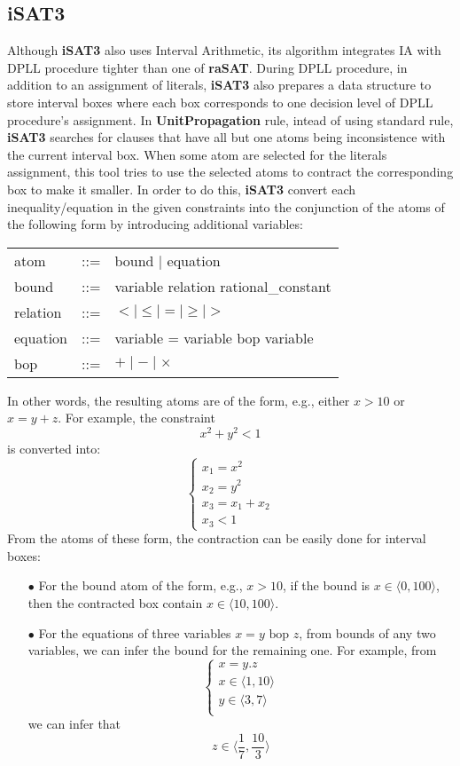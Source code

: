\subsection*{iSAT3}
Although \textbf{iSAT3} also uses Interval Arithmetic, its algorithm integrates IA with DPLL procedure tighter than one of \textbf{raSAT}. During DPLL procedure, in addition to an assignment of literals, \textbf{iSAT3} also prepares a data structure to store interval boxes where each box corresponds to one decision level of DPLL procedure's assignment. In \textbf{UnitPropagation} rule, intead of using standard rule, \textbf{iSAT3} searches for clauses that have all but one atoms being inconsistence with the current interval box. When some atom are selected for the literals assignment, this tool tries to use the selected atoms to contract the corresponding box to make it smaller. In order to do this, \textbf{iSAT3} convert each inequality/equation in the given constraints into the conjunction of the atoms of the following form by introducing additional variables:
\begin{center}
\begin{tabular}{l c l}
atom &::=& bound $\mid$ equation \\
bound &::=& variable relation rational\_constant \\
relation &::=& $< \mid \le \mid = \mid \ge \mid >$ \\
equation &::=& variable = variable bop variable \\
bop &::=& $+ \mid - \mid \times$
\end{tabular}
\end{center}
In other words, the resulting atoms are of the form, e.g., either $x > 10$ or $x = y + z$. For example, the constraint \[x^2 + y^2 < 1\]
is converted into:
\[\left\{ 
  \begin{array}{l}
    x_1 = x^2\\
    x_2 = y^2\\
    x_3 = x_1 + x_2\\
    x_3 < 1
   \end{array}
    \right.\]
From the atoms of these form, the contraction can be easily done for interval boxes:
\begin{itemize}
\item[$\bullet$] For the bound atom of the form, e.g., $x > 10$, if the bound is $x \in \langle 0, 100 \rangle$, then the contracted box contain $x \in \langle 10, 100 \rangle$.
\item[$\bullet$] For the equations of three variables $x = y \text{ bop } z$, from bounds of any two variables, we can infer the bound for the remaining one. For example, from
\[\left\{ 
  \begin{array}{l}
    x = y.z\\
    x \in \langle 1, 10 \rangle \\
    y \in \langle 3, 7 \rangle\\
   \end{array}
    \right.\]
we can infer that \[z \in \langle \frac{1}{7}, \frac{10}{3} \rangle \]
\end{itemize}

